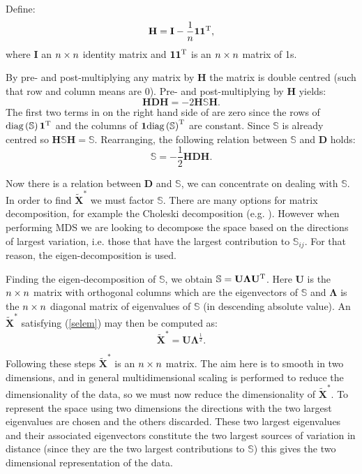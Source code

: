 Define:
\begin{equation}
\mathbf{H} = \mathbf{I}-\frac{1}{n}\bm{1}\bm{1}^{\text{T}},
\end{equation}
where $\mathbf{I}$ an $n \times n$ identity matrix and $\bm{1}\bm{1}^{\text{T}}$ is an $n \times n$ matrix of 1s.

By pre- and post-multiplying any matrix by $\mathbf{H}$ the matrix is double centred (such that row and column means are 0). Pre- and post-multiplying  by $\mathbf{H}$ yields:
\begin{equation}
\mathbf{H}\mathbf{D}\mathbf{H} = -2\mathbf{H}\mathbb{S}\mathbf{H}.
\end{equation}
The first two terms in on the right hand side of  are zero since the rows of $\text{diag}\left(\mathbb{S}\right)\bm{1}^{\text{T}}$ and the columns of  $\bm{1}\text{diag}\left(\mathbb{S}\right)^{\text{T}}$ are constant. Since $\mathbb{S}$ is already centred so $\mathbf{H}\mathbb{S}\mathbf{H}=\mathbb{S}$. Rearranging, the following relation between $\mathbb{S}$ and $\mathbf{D}$ holds:
\begin{equation}
\mathbb{S} = -\frac{1}{2}\mathbf{H}\mathbf{D}\mathbf{H}.
\end{equation}

Now there is a relation between $\mathbf{D}$ and $\mathbb{S}$, we can concentrate on dealing with $\mathbb{S}$. In order to find $\tilde{\mathbf{X}}^{*}$ we must factor $\mathbb{S}$. There are many options for matrix decomposition, for example the Choleski decomposition (e.g. \cite[pp. 334-335]{simonbook}). However when performing MDS we are looking to decompose the space based on the directions of largest variation, i.e. those that have the largest contribution to $\mathbb{S}_{ij}$. For that reason, the eigen-decomposition is used.

Finding the eigen-decomposition of $\mathbb{S}$, we obtain $\mathbb{S}=\mathbf{U}\mathbf{\Lambda}\mathbf{U}^{\text{T}}$. Here $\mathbf{U}$ is the $n \times n$ matrix with orthogonal columns which are the eigenvectors of $\mathbb{S}$ and $\mathbf{\Lambda}$ is the $n \times n$ diagonal matrix of eigenvalues of $\mathbb{S}$ (in descending absolute value). An $\tilde{\mathbf{X}}^*$ satisfying (\ref{selem}) may then be computed as:
\begin{equation}
\tilde{\mathbf{X}}^*=\mathbf{U}\mathbf{\Lambda}^{\frac{1}{2}}.
\end{equation}

Following these steps $\tilde{\mathbf{X}}^*$ is an $n \times n$ matrix. The aim here is to smooth in two dimensions, and in general multidimensional scaling is performed to reduce the dimensionality of the data, so we must now reduce the dimensionality of $\tilde{\mathbf{X}}^*$. To represent the space using two dimensions the directions with the two largest eigenvalues are chosen and the others discarded. These two largest eigenvalues and their associated eigenvectors constitute the two largest sources of variation in distance (since they are the two largest contributions to $\mathbb{S}$) this gives the two dimensional representation of the data. 

